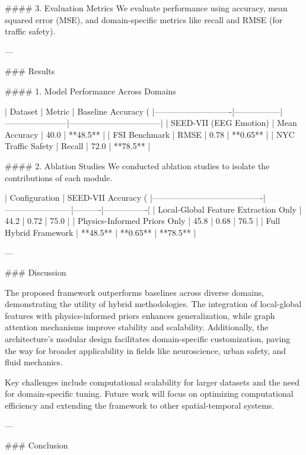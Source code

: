 #### 3. Evaluation Metrics
We evaluate performance using accuracy, mean squared error (MSE), and domain-specific metrics like recall and RMSE (for traffic safety).

---

### Results

#### 1. Model Performance Across Domains

| Dataset                    | Metric          | Baseline Accuracy (%
|----------------------------|-----------------|-----------------------|---------------------------------|
| SEED-VII (EEG Emotion)     | Mean Accuracy   | 40.0                 | **48.5**                       |
| FSI Benchmark              | RMSE           | 0.78                 | **0.65**                       |
| NYC Traffic Safety         | Recall          | 72.0                 | **78.5**                       |

#### 2. Ablation Studies
We conducted ablation studies to isolate the contributions of each module.

| Configuration                          | SEED-VII Accuracy (%
|----------------------------------------|------------------------|----------|----------------|
| Local-Global Feature Extraction Only   | 44.2                  | 0.72     | 75.0           |
| Physics-Informed Priors Only           | 45.8                  | 0.68     | 76.5           |
| Full Hybrid Framework                  | **48.5**              | **0.65** | **78.5**       |

---

### Discussion

The proposed framework outperforms baselines across diverse domains, demonstrating the utility of hybrid methodologies. The integration of local-global features with physics-informed priors enhances generalization, while graph attention mechanisms improve stability and scalability. Additionally, the architecture's modular design facilitates domain-specific customization, paving the way for broader applicability in fields like neuroscience, urban safety, and fluid mechanics.

Key challenges include computational scalability for larger datasets and the need for domain-specific tuning. Future work will focus on optimizing computational efficiency and extending the framework to other spatial-temporal systems.

---

### Conclusion

